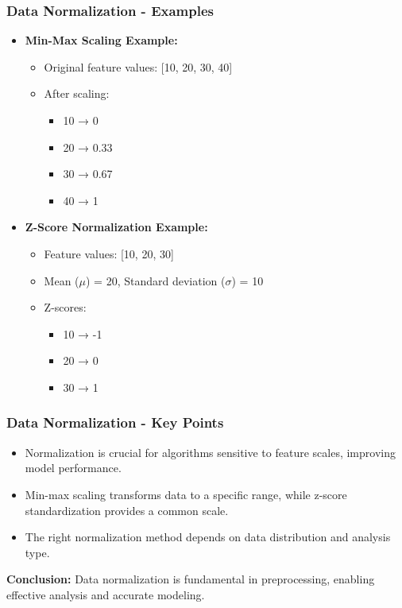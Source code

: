 \documentclass{beamer}
\begin{document}
\begin{frame}[fragile]
    \frametitle{Data Normalization - Examples}
    \begin{itemize}
        \item \textbf{Min-Max Scaling Example:}
        \begin{itemize}
            \item Original feature values: [10, 20, 30, 40]
            \item After scaling: 
            \begin{itemize}
                \item 10 → 0
                \item 20 → 0.33
                \item 30 → 0.67
                \item 40 → 1
            \end{itemize}
        \end{itemize}
        
        \item \textbf{Z-Score Normalization Example:}
        \begin{itemize}
            \item Feature values: [10, 20, 30]
            \item Mean (\(μ\)) = 20, Standard deviation (\(σ\)) = 10
            \item Z-scores:
            \begin{itemize}
                \item 10 → -1
                \item 20 → 0
                \item 30 → 1
            \end{itemize}
        \end{itemize}
    \end{itemize}
\end{frame}

\begin{frame}[fragile]
    \frametitle{Data Normalization - Key Points}
    \begin{itemize}
        \item Normalization is crucial for algorithms sensitive to feature scales, improving model performance.
        \item Min-max scaling transforms data to a specific range, while z-score standardization provides a common scale.
        \item The right normalization method depends on data distribution and analysis type.
    \end{itemize}
    
    \textbf{Conclusion:} Data normalization is fundamental in preprocessing, enabling effective analysis and accurate modeling.
\end{frame}
\end{document}
